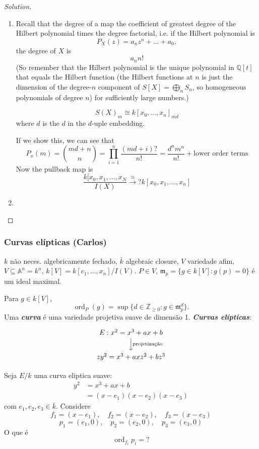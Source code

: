 \begin{proof}[Solution]\leavevmode
\begin{enumerate}[label=\alph*.]
	\item Recall that the degree of a map the coefficient of greatest degree of the Hilbert polynomial times the degree factorial, i.e. if the Hilbert polynomial is
	\[P_{X}(z)=a_nz^n+\ldots+a_0,\]
	the degree of $X$ is
	\[a_nn!\]
	(So remember that the Hilbert polynomial is the unique polynomial in $\mathbb{Q}[t]$ that equals the Hilbert function (the Hilbert functions at $n$ is just the dimension of the degree-$n$ component of $S[X]=\bigoplus_{n} S_n $, so homogeneous polynomials of degree $n$) for sufficiently large numbers.)

	\begin{claim}
		\[S(X)_m \cong k[x_0,\ldots,x_n]_{md}\]
		where $d$ is the $d$ in the $d$-uple embedding.
	\end{claim}
	If we show this, we can see that
	\[P_{x}(m)=\binom{md+n}{n}=\prod_{i=1}^n\frac{(md+i)?}{n!}=\frac{d^nm^n}{n!}+\text{lower order terms}  \]
	Now the pullback map is
	\[\frac{k[x_0,x_1,\ldots,x_N}{I(X)}\overset{\cong }{\longrightarrow}?k[x_0,x_1,\ldots,x_n]\]

	\item 
	
	\end{enumerate}

\end{proof}


\subsubsection{Curvas elípticas (Carlos)}

$k$ n\~ao neces. algebricamente fechado, $\bar{k}$ algebraic closure, $V$ variedade afim, $V\subseteq \mathbb{A}^n=k^n$, $k[V]=k[c_1,\ldots,x_n]/I(V)$. $P\in V$, $\mathfrak{m}_p=\{g\in k[V]:g(p)=0\}$ \'e um ideal maximal.

Para $g\in k[V]$,
\[\operatorname{ord}_P(g)=\operatorname{sup}\{d\in\mathbb{Z}_{\geq 0}:g\in\mathfrak{m}_p^d\}.\]
Uma \textit{\textbf{curva}} \'e uma variedade projetiva suave de dimens\~ao 1. \textit{\textbf{Curvas el\'ipticas}}:
\[\begin{tikzcd}
	E:x^2=x^3+ax+b\arrow[d,"\text{projetiza\c c\~ao}" ]\\
	zy^2=x^3+axz^2+bz^3
\end{tikzcd}\]

\begin{exercise}
	Seja $E/k$ uma curva eliptica suave:
	\begin{align*}
		y^2&=x^3+ax+b\\
		&=(x-e_1)(x-e_2)(x-e_3)
	\end{align*}
	com $e_1,e_2,e_3\in\bar{k}$. Considere
	\[f_1=(x-e_1),\quad f_2=(x-e_2),\quad f_3=(x-e_3)\]
	\[p_1=(e_1,0),\quad p_2=(e_2,0),\quad p_3=(e_3,0)\]
	O que \'e
	\[\operatorname{ord}_{f_i}p_i=?\]
\end{exercise}

